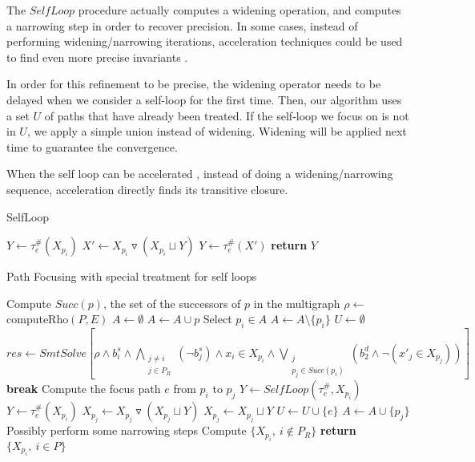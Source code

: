 \documentclass[a4paper,english,titlepage,11pt]{report}
\newcommand{\widening}{\mathop{\triangledown}}
\begin{document}
	The $SelfLoop$ procedure actually computes a widening operation, and
	computes a narrowing step in order to recover precision. In some cases,
	instead of performing widening/narrowing iterations, 
	acceleration techniques could be used 
	to find even more precise invariants \cite{GH06}.

	In order for this refinement to be precise, the widening
	operator needs to be delayed
	when we consider a self-loop for the first time. Then, our
	algorithm uses a set $U$ of paths that have already been treated. If the
	self-loop we focus on is not in $U$, we apply a simple union instead of
	widening. Widening will be applied next time to guarantee the convergence.

	When the self loop can be accelerated \cite{Gon07}, instead of doing a
	widening/narrowing sequence,  acceleration directly finds
	its transitive closure.

\begin{algorithm}
\caption{SelfLoop}
\label{loopiteralgo}
\begin{algorithmic}[1] 
	\State $Y \gets \tau_e^\#(X_{p_i})$
	\State $X' \gets X_{p_i}\widening (X_{p_i} \sqcup Y)$
	\State $Y \gets \tau_e^\#(X')$
	\State \textbf{return} $Y$
\EndProcedure
\end{algorithmic}
\end{algorithm}

\begin{algorithm}
\caption{Path Focusing with special treatment for self loops}
\label{pathfocusingoptalgo}
\begin{algorithmic}[1] 
	\State Compute $Succ(p)$, the set of the successors of $p$ in the multigraph
\EndFor
\State $\rho \gets$ computeRho$(P,E)$
\State $A \gets \emptyset$
	\State $A \gets A \cup p$
\EndFor
{}
	\State Select $p_i \in A$
	\State $A \gets A \setminus \{p_i\}$
	\State $U \gets \emptyset$
		\State $res \gets SmtSolve\left[\rho \wedge b_i^s \wedge
		\displaystyle\bigwedge_{\substack{j\neq i \\
		j\in P_R}} (\neg b_j^s) \wedge x_i \in X_{p_i} \wedge
		\bigvee_{\substack{j \\ p_j\in Succ(p_i)}} \left(b_2^d \wedge \neg (x'_j \in
		X_{p_j})\right)\right]$
			\State \textbf{break}
		\EndIf
		\State Compute the focus path $e$ from $p_i$ to $p_j$
			\State $Y \gets SelfLoop(\tau_e^\#,X_{p_i})$
		\Else
			\State $Y \gets \tau_e^\#(X_{p_i})$
		\EndIf
			\State $X_{p_j} \gets X_{p_j} \widening (X_{p_j} \sqcup Y)$
		\Else
			\State $X_{p_j} \gets X_{p_j} \sqcup Y$
			\State $U \gets U \cup \{e\}$
		\EndIf
		\State $A \gets A \cup \{p_j\}$
	\EndWhile
\EndWhile
\State Possibly perform some narrowing steps
\State Compute $\{X_{p_i},\ i \notin P_R\}$
\State \textbf{return} $\{X_{p_i},\ i \in P\}$
\EndProcedure
\end{algorithmic}
\end{algorithm}
	
\end{document}
